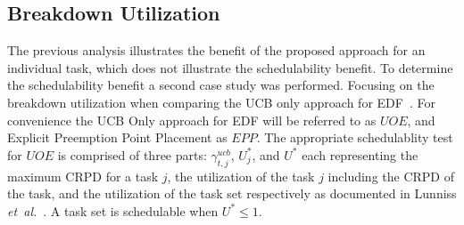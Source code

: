 \subsection{Breakdown Utilization}
The previous analysis illustrates the benefit of the proposed
approach for an individual task, which does not illustrate the
schedulability benefit. To determine the schedulability benefit a
second case study was performed. Focusing on the breakdown utilization
when comparing the UCB only approach for EDF~\cite{lunniss:13}. For
convenience the UCB Only approach for EDF will be referred to as
${UOE}$, and Explicit Preemption Point Placement as ${EPP}$.
%
The appropriate schedulablity test for ${UOE}$ is comprised of three parts:
${\gamma^{ucb}_{t,j}}$, ${U^*_j}$, and ${U^*}$ each representing
the maximum CRPD for a task ${j}$, the utilization of the task ${j}$
including the CRPD of the task, and the utilization of the task set
respectively as documented in Lunniss \emph{et~al.}~\cite{lunniss:13}.
A task set is schedulable when ${U^* \le 1}$.
%
\newline
\indent
